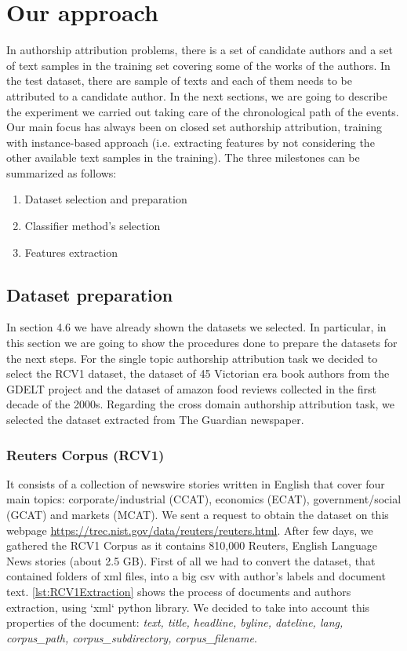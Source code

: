 \chapter{Our approach}
In authorship attribution problems, there is a set of candidate authors and a set of
text samples in the training set covering some of the works of the authors. In the
test dataset, there are sample of texts and each of them needs to be attributed to
a candidate author.
In the next sections, we are going to describe the experiment we carried out taking care of the chronological path of the events.
Our main focus has always been on closed set authorship attribution, training with instance-based approach (i.e. extracting features by not considering the other available text samples in the training).
The three milestones can be summarized as follows:
\begin{enumerate}
	\item Dataset selection and preparation
	\item Classifier method's selection
	\item Features extraction
\end{enumerate}

\section{Dataset preparation}
In section 4.6 we have already shown the datasets we selected. In particular, in this section we are going to show the procedures done to prepare the datasets for the next steps. For the single topic authorship attribution task we decided to select the RCV1 dataset, the dataset of 45 Victorian era book authors from the GDELT project and the dataset of amazon food reviews collected in the first decade of the 2000s. Regarding the cross domain authorship attribution task, we selected the dataset extracted from The Guardian newspaper.

\subsection{Reuters Corpus (RCV1)}
It consists of a collection of newswire stories written in English that cover four main topics: corporate/industrial (CCAT), economics (ECAT), government/social (GCAT) and markets (MCAT).
We sent a request to obtain the dataset on this webpage \url{https://trec.nist.gov/data/reuters/reuters.html}.
After few days, we gathered the RCV1 Corpus as it contains 810,000 Reuters, English Language News stories (about 2.5 GB).
First of all we had to convert the dataset, that contained folders of xml files, into a big csv with author's labels and document text.
\autoref{lst:RCV1Extraction} shows the process of documents and authors extraction, using `xml` python library. We decided to take into account this properties of the document: \textit{text, title, headline, byline, dateline, lang, corpus\_path, corpus\_subdirectory, corpus\_filename}.


